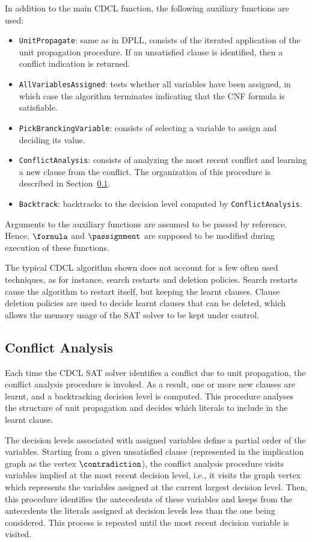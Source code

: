In addition to the main CDCL function, the following auxiliary functions are
used:
\begin{itemize}
    \item \texttt{UnitPropagate}:
        same as in DPLL, consists of the iterated application of the unit
        propagation procedure. If an unsatisfied clause is identified, then a
        conflict indication is returned.
    \item \texttt{AllVariablesAssigned}:
        tests whether all variables have been assigned, in which case the
        algorithm terminates indicating that the CNF formula is satisfiable. 
    \item \texttt{PickBranckingVariable}:
        consists of selecting a variable to assign and deciding its value.
    \item \texttt{ConflictAnalysis}:
        consists of analyzing the most recent conflict and learning a new clause
        from the conflict. The organization of this procedure is described in
        Section~\ref{sec:conflictanalysis}.
    \item \texttt{Backtrack}:
        backtracks to the decision level computed by \texttt{ConflictAnalysis}.
\end{itemize}

Arguments to the auxiliary functions are assumed to be passed by reference.
Hence, $\formula$ and $\passignment$ are supposed to be modified during execution
of these functions.

The typical CDCL algorithm shown does not account for a few often used
techniques, as for instance, search restarts and deletion policies. Search
restarts cause the algorithm to restart itself, but keeping the learnt clauses.
Clause deletion policies are used to decide learnt clauses that can be deleted,
which allows the memory usage of the SAT solver to be kept under control.

\subsection{Conflict Analysis}%
\label{sec:conflictanalysis}

Each time the CDCL SAT solver identifies a conflict due to unit propagation, the
conflict analysis procedure is invoked. As a result, one or more new clauses are
learnt, and a backtracking decision level is computed. This procedure analyses
the structure of unit propagation and decides which literals to include in the
learnt clause.

The decision levels associated with assigned variables define a partial order of
the variables. Starting from a given unsatisfied clause (represented in the
implication graph as the vertex $\contradiction$), the conflict analysis
procedure visits variables implied at the most recent decision level, i.e., it
visits the graph vertex which represents the variables assigned at the current
largest decision level. Then, this procedure identifies the antecedents of these
variables and keeps from the antecedents the literals assigned at decision
levels less than the one being considered. This process is repeated until the
most recent decision variable is visited.


